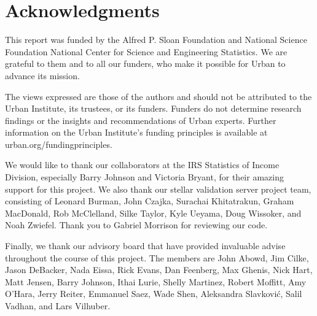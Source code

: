\fancyfoot{}



\part{Acknowledgments}

This report was funded by the Alfred P. Sloan Foundation and National Science Foundation National Center for Science and Engineering Statistics. We are grateful to them and to all our funders, who make it possible for Urban to advance its mission. 

The views expressed are those of the authors and should not be attributed to the Urban Institute, its trustees, or its funders. Funders do not determine research findings or the insights and recommendations of Urban experts. Further information on the Urban Institute’s funding principles is available at urban.org/fundingprinciples.

We would like to thank our collaborators at the IRS Statistics of Income Division, especially Barry Johnson and Victoria Bryant, for their amazing support for this project. We also thank our stellar validation server project team, consisting of Leonard Burman, John Czajka, Surachai Khitatrakun, Graham MacDonald, Rob McClelland, Silke Taylor, Kyle Ueyama, Doug Wissoker, and Noah Zwiefel. Thank you to Gabriel Morrison for reviewing our code.

Finally, we thank our advisory board that have provided invaluable advise throughout the course of this project. The members are John Abowd, Jim Cilke, Jason DeBacker, Nada Eissa, Rick Evans, Dan Feenberg, Max Ghenis, Nick Hart, Matt Jensen, Barry Johnson, Ithai Lurie,  Shelly Martinez, Robert Moffitt, Amy O'Hara, Jerry Reiter, Emmanuel Saez, Wade Shen, Aleksandra Slavkovi\'c, Salil Vadhan, and Lars Vilhuber.